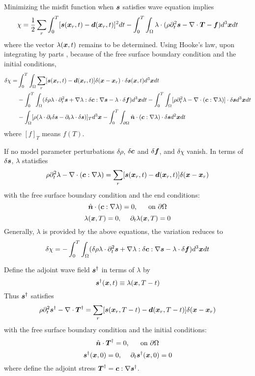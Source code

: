 Minimizing the misfit function when $\boldsymbol{s}$ satisfies wave equation implies
\[ \chi=\frac{1}{2}\sum_r\int_0^T[\boldsymbol{s}(\boldsymbol{x}_r,t)-\boldsymbol{d}(\boldsymbol{x}_r,t)]^2dt-\int_0^T\int_\Omega\lambda\cdot(\rho\partial_t^2\boldsymbol{s}-\nabla\cdot\boldsymbol{T}-\boldsymbol{f})d^3\boldsymbol{x}dt \]
where the vector  $\lambda(\boldsymbol{x},t)$ remains to be determined.
Using Hooke's law, upon integrating by parts
,
because of the free surface boundary condition and the initial conditions,
\begin{align*}
  \delta\chi= & \int_0^T\int_\Omega\sum_r[\boldsymbol{s}(\boldsymbol{x}_r,t)-\boldsymbol{d}(\boldsymbol{x}_r,t)]\delta(\boldsymbol{x}-\boldsymbol{x}_r)\cdot\delta\boldsymbol{s}(\boldsymbol{x},t)d^3\boldsymbol{x}dt \\
  & -\int_0^T\int_\Omega(\delta\rho\lambda\cdot\partial_t^2\boldsymbol{s}+\nabla\lambda:\delta\boldsymbol{c}:\nabla\boldsymbol{s}-\lambda\cdot\delta\boldsymbol{f})d^3\boldsymbol{x}dt-\int_0^T\int_\Omega[\rho\partial_t^2\lambda-\nabla\cdot(\boldsymbol{c}:\nabla\lambda)]\cdot\delta\boldsymbol{s}d^3\boldsymbol{x}dt \\
  & -\int_\Omega[\rho(\lambda\cdot\partial_t\delta\boldsymbol{s}-\partial_t\lambda\cdot\delta\boldsymbol{s})]_Td^3\boldsymbol{x}-\int_0^T\int_{\partial\Omega}\hat{\boldsymbol{n}}\cdot(\boldsymbol{c}:\nabla\lambda)\cdot\delta\boldsymbol{s}d^2\boldsymbol{x}dt
\end{align*}
where $[f]_T$ means $f(T)$.

If no model parameter perturbations $\delta\rho$, $\delta\boldsymbol{c}$ and $\delta\boldsymbol{f}$,
and $\delta\chi$ vanish.
In terms of $\delta\boldsymbol{s}$, $\lambda$ statisfies
\[ \rho\partial_t^2\lambda-\nabla\cdot(\boldsymbol{c}:\nabla\lambda)=\sum_r[\boldsymbol{s}(\boldsymbol{x}_r,t)-\boldsymbol{d}(\boldsymbol{x}_r,t)]\delta(\boldsymbol{x}-\boldsymbol{x}_r) \]
with the free surface boundary condition and the end conditions:
\[ \hat{\boldsymbol{n}}\cdot(\boldsymbol{c}:\nabla\lambda)=0 \text{,\hspace{5mm} on } \partial\Omega \]
\[ \lambda(\boldsymbol{x},T)=0 \text{,\hspace{5mm}} \partial_t\lambda(\boldsymbol{x},T)=0 \]
Generally, $\lambda$ is provided by the above equations, the variation reduces to
\[ \delta\chi=-\int_0^T\int_\Omega(\delta\rho\lambda\cdot\partial_t^2\boldsymbol{s}+\nabla\lambda:\delta\boldsymbol{c}:\nabla\boldsymbol{s}-\lambda\cdot\delta\boldsymbol{f})d^3\boldsymbol{x}dt \]

Define the adjoint wave field $\boldsymbol{s}^\dagger$ in terms of $\lambda$ by
\[ \boldsymbol{s}^\dagger(\boldsymbol{x},t)\equiv\lambda(\boldsymbol{x},T-t) \]
Thus $\boldsymbol{s}^\dagger$ satisfies
\[ \rho\partial_t^2\boldsymbol{s}^\dagger-\nabla\cdot\boldsymbol{T}^\dagger=\sum_r[\boldsymbol{s}(\boldsymbol{x}_r,T-t)-\boldsymbol{d}(\boldsymbol{x}_r,T-t)]\delta(\boldsymbol{x}-\boldsymbol{x}_r) \]
with the free surface boundary condition and the initial conditions:
\[ \hat{\boldsymbol{n}}\cdot\boldsymbol{T}^\dagger=0 \text{,\hspace{5mm} on } \partial\Omega \]
\[ \boldsymbol{s}^\dagger(\boldsymbol{x},0)=0 \text{,\hspace{5mm}} \partial_t\boldsymbol{s}^\dagger(\boldsymbol{x},0)=0 \]
where define the adjoint stress $\boldsymbol{T}^\dagger=\boldsymbol{c}:\nabla\boldsymbol{s}^\dagger$.

